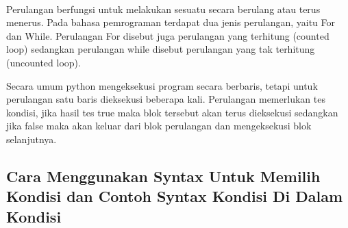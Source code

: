 \documentclass{article}
\begin{document}
\paragraph{}
            Perulangan berfungsi untuk melakukan sesuatu secara berulang atau terus menerus. Pada bahasa pemrograman terdapat dua jenis perulangan, yaitu For dan While. Perulangan For disebut juga perulangan yang terhitung (counted loop) sedangkan perulangan while disebut perulangan yang tak terhitung (uncounted loop).
            \par
            Secara umum python mengeksekusi program secara berbaris, tetapi untuk perulangan satu baris dieksekusi beberapa kali. Perulangan memerlukan tes kondisi, jika hasil tes true maka blok tersebut akan terus dieksekusi sedangkan jika false maka akan keluar dari blok perulangan dan mengeksekusi blok selanjutnya.

\subsection{Cara Menggunakan Syntax Untuk Memilih Kondisi dan Contoh Syntax Kondisi Di Dalam Kondisi}
\end{document}
